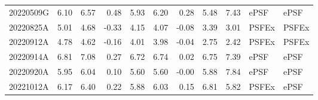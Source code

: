 \begin{longtable}{lrrrrrrrrll}
 20220509G & 6.10 & 6.57 & 0.48 & 5.93 & 6.20 & 0.28 & 5.48 & 7.43 & ePSF & ePSF \\
 20220825A & 5.01 & 4.68 & -0.33 & 4.15 & 4.07 & -0.08 & 3.39 & 3.01 & PSFEx & PSFEx \\
 20220912A & 4.78 & 4.62 & -0.16 & 4.01 & 3.98 & -0.04 & 2.75 & 2.42 & PSFEx & PSFEx \\
 20220914A & 6.81 & 7.08 & 0.27 & 6.72 & 6.74 & 0.02 & 6.75 & 7.39 & ePSF & ePSF \\
 20220920A & 5.95 & 6.04 & 0.10 & 5.60 & 5.60 & -0.00 & 5.88 & 7.84 & ePSF & ePSF \\
 20221012A & 6.17 & 6.40 & 0.22 & 5.88 & 6.03 & 0.15 & 6.81 & 5.82 & PSFEx & ePSF \\
\hline
\end{longtable}